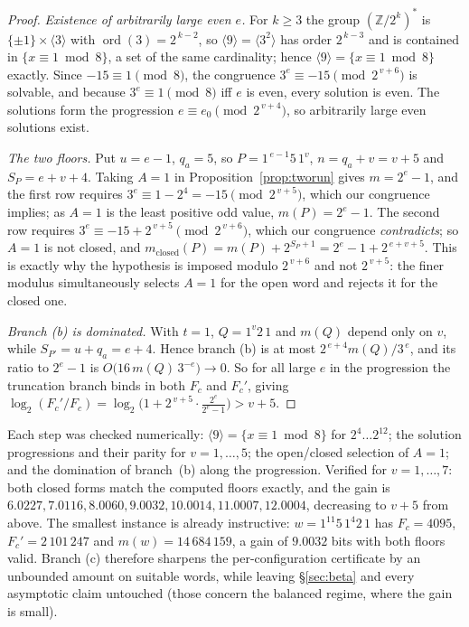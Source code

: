 \documentclass[11pt,a4paper]{article}
\theoremstyle{plain}
\theoremstyle{definition}
\newcommand{\Fc}{F_{c}}
\begin{document}
\begin{proof}
\emph{Existence of arbitrarily large even $e$.} For $k\ge3$ the group
$(\mathbb{Z}/2^{k})^{*}$ is $\{\pm1\}\times\langle3\rangle$ with
$\operatorname{ord}(3)=2^{\,k-2}$, so $\langle9\rangle=\langle3^{2}\rangle$ has
order $2^{\,k-3}$ and is contained in $\{x\equiv1\bmod 8\}$, a set of the same
cardinality; hence $\langle9\rangle=\{x\equiv1\bmod 8\}$ exactly. Since
$-15\equiv1\pmod 8$, the congruence $3^{e}\equiv-15\pmod{2^{\,v+6}}$ is
solvable, and because $3^{e}\equiv1\pmod 8$ iff $e$ is even, every solution is
even. The solutions form the progression $e\equiv e_0 \pmod{2^{\,v+4}}$, so
arbitrarily large even solutions exist.

\emph{The two floors.} Put $u=e-1$, $q_a=5$, so $P=1^{\,e-1}5\,1^{v}$,
$n=q_a+v=v+5$ and $S_P=e+v+4$. Taking $A=1$ in
Proposition~\ref{prop:tworun} gives $m=2^{e}-1$, and the first row requires
$3^{e}\equiv1-2^{4}=-15\pmod{2^{\,v+5}}$, which our congruence implies; as
$A=1$ is the least positive odd value, $m(P)=2^{e}-1$. The second row requires
$3^{e}\equiv-15+2^{\,v+5}\pmod{2^{\,v+6}}$, which our congruence
\emph{contradicts}; so $A=1$ is not closed, and
$m_{\mathrm{closed}}(P)=m(P)+2^{S_P+1}=2^{e}-1+2^{\,e+v+5}$. This is exactly
why the hypothesis is imposed modulo $2^{\,v+6}$ and not $2^{\,v+5}$: the finer
modulus simultaneously selects $A=1$ for the open word and rejects it for the
closed one.

\emph{Branch (b) is dominated.} With $t=1$, $Q=1^{v}2\,1$ and $m(Q)$ depend only
on $v$, while $S_{P'}=u+q_a=e+4$. Hence branch (b) is at most
$2^{\,e+4}m(Q)/3^{\,e}$, and its ratio to $2^{e}-1$ is
$O\bigl(16\,m(Q)\,3^{-e}\bigr)\to0$. So for all large $e$ in the progression the
truncation branch binds in both $\Fc$ and $\Fc'$, giving
$\log_2(\Fc'/\Fc)=\log_2\bigl(1+2^{\,v+5}\cdot\tfrac{2^{e}}{2^{e}-1}\bigr)>v+5$.
\end{proof}

Each step was checked numerically: $\langle9\rangle=\{x\equiv1\bmod8\}$ for
$2^{4}\dots2^{12}$; the solution progressions and their parity for
$v=1,\dots,5$; the open/closed selection of $A=1$; and the domination of
branch~(b) along the progression. Verified for $v=1,\dots,7$: both closed forms match the computed floors
exactly, and the gain is $6.0227, 7.0116, 8.0060, 9.0032, 10.0014, 11.0007,
12.0004$, decreasing to $v+5$ from above. The smallest instance is already
instructive: $w=1^{11}5\,1^{4}2\,1$ has $\Fc=4095$, $\Fc'=2\,101\,247$ and
$m(w)=14\,684\,159$, a gain of $9.0032$ bits with both floors valid. Branch (c)
therefore sharpens the per-configuration certificate by an unbounded amount on
suitable words, while leaving \S\ref{sec:beta} and every asymptotic claim
untouched (those concern the balanced regime, where the gain is small).
\end{document}
